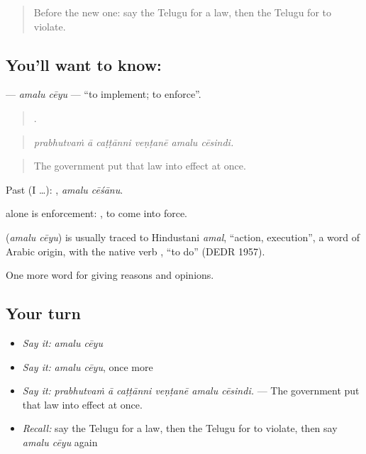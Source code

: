 \label{lesson:TE-C398-amalu-ceyu}



\begin{quote}
Before the new one: say the Telugu for a law, then the Telugu for to violate.
\end{quote}

\subsection*{You'll want to know:  }
\textbf{ } — \emph{amalu cēyu} — \textquotedblleft{}to implement; to enforce\textquotedblright{}.

\begin{quote}
     .
\end{quote}

\begin{quote}
\emph{prabhutvaṁ ā caṭṭānni veṇṭanē amalu cēsindi.}
\end{quote}

\begin{quote}
The government put that law into effect at once.
\end{quote}

Past (I …):  , \emph{amalu cēśānu}.

 alone is enforcement:  , to come into force.

\begin{cousinweb}
\textbf{ } (\emph{amalu cēyu}) is usually traced to Hindustani \emph{amal}, \textquotedblleft{}action, execution\textquotedblright{}, a word of Arabic origin, with the native verb , \textquotedblleft{}to do\textquotedblright{} (DEDR 1957).
\end{cousinweb}

\begin{grammarlens}[title={What you've built}]
One more word for giving reasons and opinions.
\end{grammarlens}

\subsection*{Your turn}
\begin{itemize}
\raggedright
  \item \emph{Say it:} \emph{amalu cēyu}
  \item \emph{Say it:} \emph{amalu cēyu}, once more
  \item \emph{Say it:} \emph{prabhutvaṁ ā caṭṭānni veṇṭanē amalu cēsindi.} — The government put that law into effect at once.
  \item \emph{Recall:} say the Telugu for a law, then the Telugu for to violate, then say \emph{amalu cēyu} again
\end{itemize}

